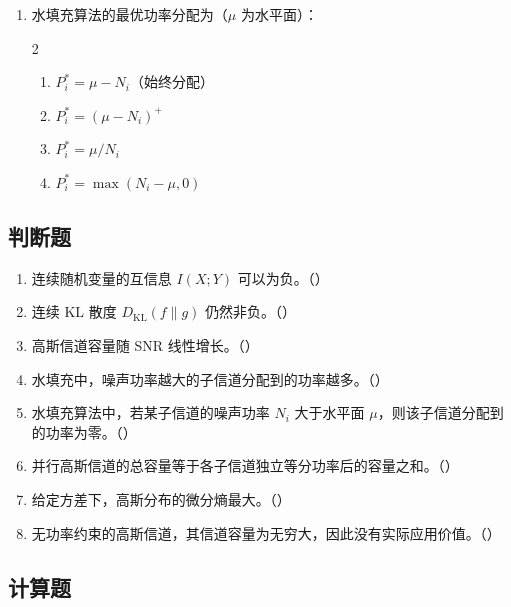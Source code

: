 \documentclass[12pt,a4paper]{ctexart}
\newcommand{\DKL}{D_{\mathrm{KL}}}
\begin{document}
\begin{enumerate}[label=\arabic*., leftmargin=*]
\item 水填充算法的最优功率分配为（$\mu$ 为水平面）：
\begin{multicols}{2}
\begin{enumerate}[label=(\Alph*)]
  \item $P_i^* = \mu - N_i$（始终分配）
  \item $P_i^* = (\mu - N_i)^+$
  \item $P_i^* = \mu / N_i$
  \item $P_i^* = \max(N_i - \mu, 0)$
\end{enumerate}
\end{multicols}

\end{enumerate}

\subsection*{判断题}

\begin{enumerate}[label=\arabic*., leftmargin=*]
\item 连续随机变量的互信息 $I(X;Y)$ 可以为负。（\quad）
\item 连续 KL 散度 $\DKL(f\|g)$ 仍然非负。（\quad）
\item 高斯信道容量随 SNR 线性增长。（\quad）
\item 水填充中，噪声功率越大的子信道分配到的功率越多。（\quad）
\item 水填充算法中，若某子信道的噪声功率 $N_i$ 大于水平面 $\mu$，则该子信道分配到的功率为零。（\quad）
\item 并行高斯信道的总容量等于各子信道独立等分功率后的容量之和。（\quad）
\item 给定方差下，高斯分布的微分熵最大。（\quad）
\item 无功率约束的高斯信道，其信道容量为无穷大，因此没有实际应用价值。（\quad）
\end{enumerate}

\subsection*{计算题}
\end{document}
